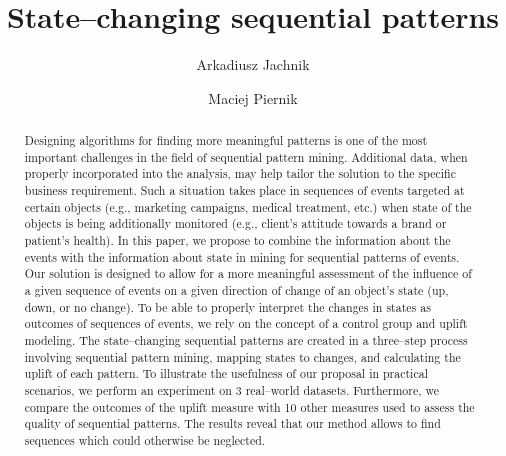 \documentclass[runningheads,a4paper]{llncs}
\begin{document}
\mainmatter

\title{State--changing sequential patterns}


\author{Arkadiusz Jachnik \and Maciej Piernik}



\maketitle

\begin{abstract}
Designing algorithms for finding more meaningful patterns is one of the most important challenges in the field of sequential pattern mining.
Additional data, when properly incorporated into the analysis, may help tailor the solution to the specific business requirement.
Such a situation takes place in sequences of events targeted at certain objects (e.g., marketing campaigns, medical treatment, etc.) when state of the objects is being additionally monitored (e.g., client's attitude towards a brand or patient's health).
In this paper, we propose to combine the information about the events with the information about state in mining for sequential patterns of events.
Our solution is designed to allow for a more meaningful assessment of the influence of a given sequence of events on a given direction of change of an object's state (up, down, or no change).
To be able to properly interpret the changes in states as outcomes of sequences of events, we rely on the concept of a control group and uplift modeling.
The state--changing sequential patterns are created in a three--step process involving sequential pattern mining, mapping states to changes, and calculating the uplift of each pattern.
To illustrate the usefulness of our proposal in practical scenarios, we perform an experiment on 3 real--world datasets.
Furthermore, we compare the outcomes of the uplift measure with 10 other measures used to assess the quality of sequential patterns.
The results reveal that our method allows to find sequences which could otherwise be neglected.
\end{abstract}
\end{document}
